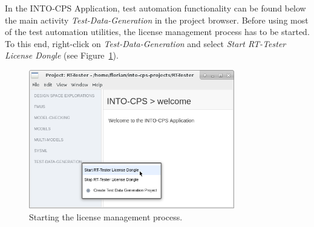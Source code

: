 In the INTO-CPS Application, test automation functionality can be found
below the main activity \emph{Test-Data-Generation} in the project browser.
%
Before using most of the test automation utilities,
the license management process has to be started.
To this end, right-click on \emph{Test-Data-Generation} and
select \emph{Start RT-Tester License Dongle}
(see Figure~\ref{figure:INTO-CPS-App:TDG:Start-License-Dongle}).
%
%
%
\begin{figure}[ht]
    \centerline{\includegraphics[width=0.8\textwidth]{figures/VSI-TDG_Start-License-Dongle}}
    \caption{Starting the license management process.}
    \label{figure:INTO-CPS-App:TDG:Start-License-Dongle}
\end{figure}
%
%
%

